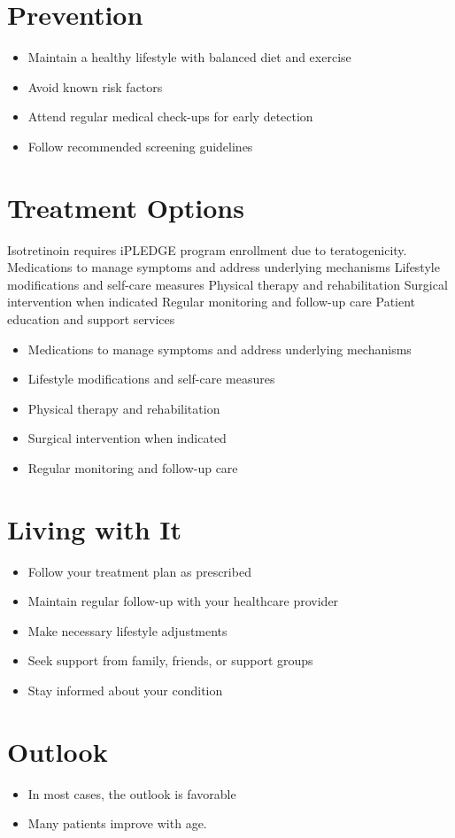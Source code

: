 \section{Prevention}
\begin{itemize}[noitemsep]
  \item Maintain a healthy lifestyle with balanced diet and exercise
  \item Avoid known risk factors
  \item Attend regular medical check-ups for early detection
  \item Follow recommended screening guidelines
\end{itemize}
\section{Treatment Options}
Isotretinoin requires iPLEDGE program enrollment due to teratogenicity. Medications to manage symptoms and address underlying mechanisms Lifestyle modifications and self-care measures Physical therapy and rehabilitation Surgical intervention when indicated Regular monitoring and follow-up care Patient education and support services

\begin{itemize}[noitemsep]
  \item Medications to manage symptoms and address underlying mechanisms
  \item Lifestyle modifications and self-care measures
  \item Physical therapy and rehabilitation
  \item Surgical intervention when indicated
  \item Regular monitoring and follow-up care
\end{itemize}
\section{Living with It}
\begin{itemize}[noitemsep]
  \item Follow your treatment plan as prescribed
  \item Maintain regular follow-up with your healthcare provider
  \item Make necessary lifestyle adjustments
  \item Seek support from family, friends, or support groups
  \item Stay informed about your condition
\end{itemize}
\section{Outlook}
\begin{itemize}[noitemsep]
  \item In most cases, the outlook is favorable
  \item Many patients improve with age.
\end{itemize}
